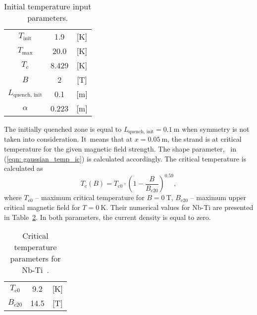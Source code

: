 \begin{table}[H]
    \caption{Initial temperature input parameters.} 
    \vspace{-1.em} 
    \fontsize{10}{10}
    \selectfont 
    \renewcommand{\arraystretch}{1.5}
    \begin{center}
        \begin{tabular}{ ccc }  
        \hline
        $T_\text{init}$ & 1.9 & [K] \\
        $T_\text{max}$ & 20.0 & [K] \\
        $T_\text{c}$ & 8.429 & [K] \\
        $B$ & 2 & [T] \\
        $L_\text{quench, init}$ & 0.1 & [m] \\ 
        $\alpha$ & 0.223 & [m] \\   
        \hline 
        \end{tabular}
    \end{center}  
     \label{table: 1d_quench_propagation_analysis_init_temp_input_parameters} 
 \end{table}

The initially quenched zone is equal to $L_\text{quench, init}= 0.1~\text{m}$ when symmetry is not taken into consideration. It~means that at $x=0.05~\text{m}$, the strand is at critical temperature for the given magnetic field strength. The shape parameter, \textalpha~in (\ref{eqn: gaussian_temp_ic}) is calculated accordingly. The critical temperature is calculated as
\begin{equation}
    T_\text{c}(B) = T_\text{c0}\cdot(1-\frac{B}{B_\text{c20}})^{0.59},
\end{equation}
where $T_\text{c0}$ -- maximum critical temperature for $B=0~\text{T}$, $B_\text{c20}$ -- maximum upper critical magnetic field for $T=0~\text{K}$. Their numerical values for Nb-Ti are presented in Table~\ref{table: 1d_quench_propagation_analysis_crit_temp_params}. In both parameters, the current density is equal to zero. 

\begin{table}[H]
    \caption{Critical temperature parameters for Nb-Ti~\cite[p.~755]{empirical_scaling_formulas_for_critical_current}.} 
    \vspace{-1.em} 
    \fontsize{10}{10}
    \selectfont 
    \renewcommand{\arraystretch}{1.5}
    \begin{center}
        \begin{tabular}{ ccc }  
        \hline
        $T_\text{c0}$ & 9.2 & [K] \\
        $B_\text{c20}$ & 14.5 & [T] \\
        \hline 
        \end{tabular}
    \end{center}  
     \label{table: 1d_quench_propagation_analysis_crit_temp_params} 
 \end{table}


